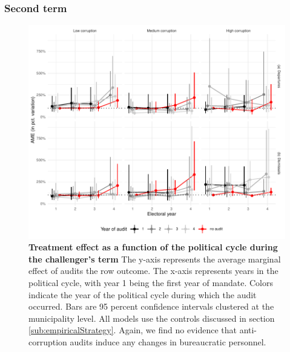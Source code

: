 \documentclass[12pt,a4paper]{article}
\theoremstyle{definition}
\begin{document}
{\subsubsection*{Second term}

\begin{figure}[H]
    \centering
    \includegraphics{figures/AMEpolitical_term2Client.pdf}
    \caption{{\bf Treatment effect as a function of the political cycle during the challenger's term} The y-axis represents the average marginal effect of audits the row outcome. The x-axis represents years in the political cycle, with year 1 being the first year of mandate. Colors indicate the year of the political cycle during which the audit occurred. Bars are 95 percent confidence intervals clustered at the municipality level. All models use the controls discussed in section \ref{sub:empiricalStrategy}. Again, we find no evidence that anti-corruption audits induce any changes in bureaucratic personnel.}
    \label{fig:AMEpolitical2}
\end{figure}

}
\end{document}
